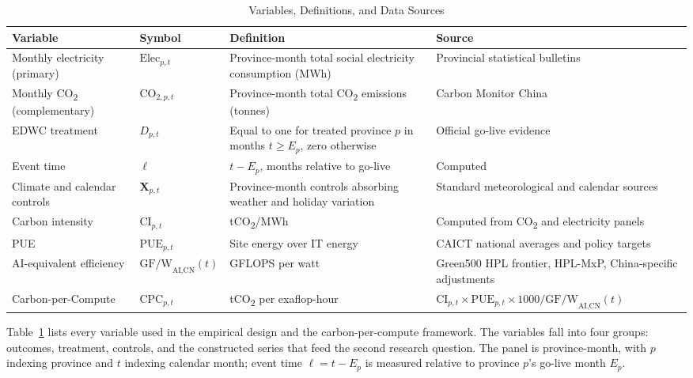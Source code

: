 \documentclass[12pt,a4paper]{article}
\begin{document}
\begin{table}[htbp]
\centering
\caption{Variables, Definitions, and Data Sources}
\label{tab:variables}
\small
\begin{tabular}{p{3.6cm} p{2.2cm} p{5.0cm} p{3.5cm}}
\toprule
\textbf{Variable} & \textbf{Symbol} & \textbf{Definition} & \textbf{Source} \\
\midrule
Monthly electricity (primary)
  & $\text{Elec}_{p,t}$
  & Province-month total social electricity consumption (MWh)
  & Provincial statistical bulletins \\[0.2cm]
Monthly CO\textsubscript{2} (complementary)
  & $\text{CO}_{2,p,t}$
  & Province-month total CO\textsubscript{2} emissions (tonnes)
  & Carbon Monitor China \\[0.2cm]
EDWC treatment
  & $D_{p,t}$
  & Equal to one for treated province $p$ in months $t \geq E_p$, zero otherwise
  & Official go-live evidence \\[0.2cm]
Event time
  & $\ell$
  & $t - E_p$, months relative to go-live
  & Computed \\[0.2cm]
Climate and calendar controls
  & $\mathbf{X}_{p,t}$
  & Province-month controls absorbing weather and holiday variation
  & Standard meteorological and calendar sources \\[0.2cm]
Carbon intensity
  & $\text{CI}_{p,t}$
  & tCO\textsubscript{2}/MWh
  & Computed from CO\textsubscript{2} and electricity panels \\[0.2cm]
PUE
  & $\text{PUE}_{p,t}$
  & Site energy over IT energy
  & CAICT national averages and policy targets \\[0.2cm]
AI-equivalent efficiency
  & $\text{GF/W}_{\text{AI,CN}}(t)$
  & GFLOPS per watt
  & Green500 HPL frontier, HPL-MxP, China-specific adjustments \\[0.2cm]
Carbon-per-Compute
  & $\text{CPC}_{p,t}$
  & tCO\textsubscript{2} per exaflop-hour
  & $\text{CI}_{p,t} \times \text{PUE}_{p,t} \times 1000 / \text{GF/W}_{\text{AI,CN}}(t)$ \\
\bottomrule
\end{tabular}
\end{table}


Table~\ref{tab:variables} lists every variable used in the empirical
design and the carbon-per-compute framework. The variables fall into
four groups: outcomes, treatment, controls, and the constructed
series that feed the second research question. The panel is
province-month, with $p$ indexing province and $t$ indexing calendar
month; event time $\ell = t - E_p$ is measured relative to province
$p$'s go-live month $E_p$.
\end{document}
